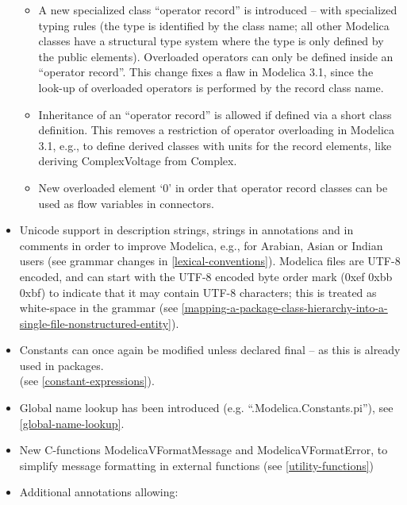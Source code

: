 \documentclass[../MLS.tex]{subfiles}
\begin{document}
\begin{itemize}
  \begin{itemize}
  \item
    A new specialized class ``operator record'' is introduced -- with
    specialized typing rules (the type is identified by the class name;
    all other Modelica classes have a structural type system where the
    type is only defined by the public elements). Overloaded operators
    can only be defined inside an ``operator record''. This change fixes
    a flaw in Modelica 3.1, since the look-up of overloaded operators is
    performed by the record class name.
  \item
    Inheritance of an ``operator record'' is allowed if defined via a
    short class definition. This removes a restriction of operator
    overloading in Modelica 3.1, e.g., to define derived classes with
    units for the record elements, like deriving ComplexVoltage from
    Complex.
  \item
    New overloaded element `0' in order that operator record classes can
    be used as flow variables in connectors.
  \end{itemize}
\item
  Unicode support in description strings, strings in annotations and in
  comments in order to improve Modelica, e.g., for Arabian, Asian or
  Indian users (see grammar changes in \autoref{lexical-conventions}). Modelica files are
  UTF-8 encoded, and can start with the UTF-8 encoded byte order mark
  (0xef 0xbb 0xbf) to indicate that it may contain UTF-8 characters;
  this is treated as white-space in the grammar (see \autoref{mapping-a-package-class-hierarchy-into-a-single-file-nonstructured-entity}).
\item
  Constants can once again be modified unless declared final -- as this
  is already used in packages.\\
  (see \autoref{constant-expressions}).
\item
  Global name lookup has been introduced (e.g.
  ``.Modelica.Constants.pi''), see \autoref{global-name-lookup}.
\item
  New C-functions ModelicaVFormatMessage and ModelicaVFormatError, to
  simplify message formatting in external functions (see \autoref{utility-functions})
\item
  Additional annotations allowing:


\end{itemize}
\end{document}
